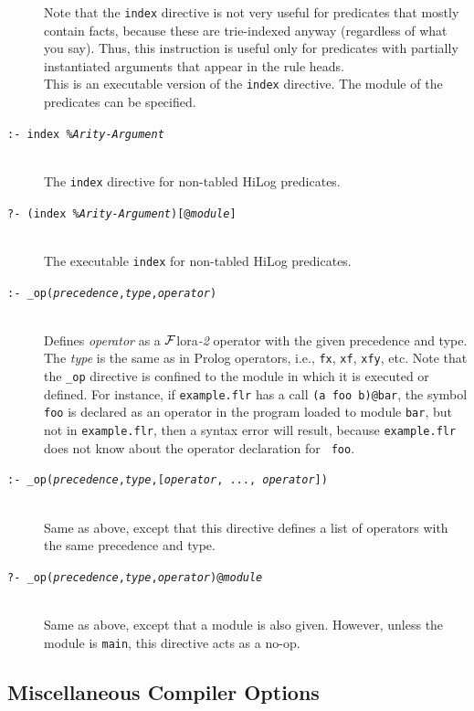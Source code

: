 \documentclass[11pt]{article}
\newcommand{\FLORA}{{\mbox{\sc ${\cal F}${lora}\rm\emph{-2}}}\xspace}
\begin{document}
\begin{description}
  Note that the {\tt index} directive is not very useful for predicates
  that mostly contain facts, because these are trie-indexed anyway
  (regardless of what you say). Thus, this instruction is useful only for
  predicates with partially instantiated arguments that appear in the rule
  heads.
~~~  \\
  This is an executable version of the {\tt index} directive.  The
  module of the predicates can be specified.
\item[{\tt :- index \emph{\%Arity-Argument} }]
~~~  \\
  The {\tt index} directive for non-tabled HiLog predicates.
\item[{\tt ?- (index \emph{\%Arity-Argument})[@\emph{module}] }]
~~~  \\
  The executable {\tt index} for non-tabled HiLog predicates.

\item[{\tt :-  \_op({\it precedence},{\it type},{\it operator})}]
 ~~~ \\
  Defines \emph{operator} as a \FLORA operator with the given precedence
  and type. The \emph{type} is the same as in Prolog operators, i.e.,
  {\tt fx}, {\tt xf}, {\tt xfy}, etc.
  Note that the {\tt \_op} directive is confined to
  the module in which it is executed or defined. For instance, if
  {\tt example.flr} has a call {\tt (a foo b)@bar}, the symbol {\tt foo} is
  declared as an operator in the program loaded to module {\tt bar}, but not in
  {\tt example.flr}, then a syntax error will result, because 
   {\tt example.flr} does not know about the operator declaration for {\tt
  foo}.
\item[{\tt :-  \_op({\it precedence},{\it type},[{\it operator}, ..., {\it operator}])}]
~~~  \\
  Same as above, except that this directive defines a list of operators
  with the same precedence and type.
\item[{\tt ?-  \_op({\it precedence},{\it type},{\it operator})@\emph{module}}]
 ~~~ \\
  Same as above, except that a module is also given. However, unless the
  module is {\tt main}, this directive acts as a no-op.
\end{description}


\subsection{Miscellaneous Compiler Options}
\end{document}
